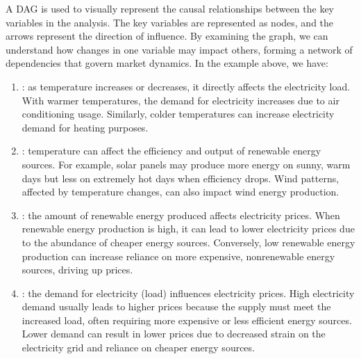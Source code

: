 \documentclass[letterpaper,10pt,english]{jupyterBook}
\begin{document}
\sphinxAtStartPar
A DAG is used to visually represent the causal relationships between the key variables in the analysis. The key variables are represented as nodes, and the arrows represent the direction of influence. By examining the graph, we can understand how changes in one variable may impact others, forming a network of dependencies that govern market dynamics. In the example above, we have:
\begin{enumerate}
%
\item {} 
\sphinxAtStartPar
{}: as temperature increases or decreases, it directly affects the electricity load. With warmer temperatures, the demand for electricity increases due to air conditioning usage. Similarly, colder temperatures can increase electricity demand for heating purposes.

\item {} 
\sphinxAtStartPar
{}: temperature can affect the efficiency and output of renewable energy sources. For example, solar panels may produce more energy on sunny, warm days but less on extremely hot days when efficiency drops. Wind patterns, affected by temperature changes, can also impact wind energy production.

\item {} 
\sphinxAtStartPar
{}: the amount of renewable energy produced affects electricity prices. When renewable energy production is high, it can lead to lower electricity prices due to the abundance of cheaper energy sources. Conversely, low renewable energy production can increase reliance on more expensive, non\sphinxhyphen{}renewable energy sources, driving up prices.

\item {} 
\sphinxAtStartPar
{}: the demand for electricity (load) influences electricity prices. High electricity demand usually leads to higher prices because the supply must meet the increased load, often requiring more expensive or less efficient energy sources. Lower demand can result in lower prices due to decreased strain on the electricity grid and reliance on cheaper energy sources.

\end{enumerate}

\sphinxAtStartPar
{}
\end{document}
